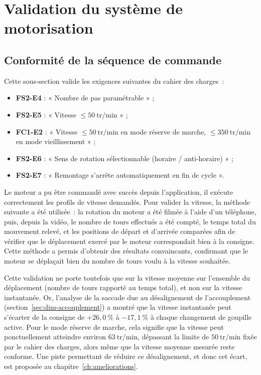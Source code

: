 
\section{Validation du système de motorisation}
\label{sec:valid-moteur}

\subsection{Conformité de la séquence de commande}

Cette sous-section valide les exigences suivantes du cahier des charges~:
\begin{itemize}
    \item \textbf{FS2-E4} : « Nombre de pas paramétrable » ;
    \item \textbf{FS2-E5} : « Vitesse $\leq 50\ \mathrm{tr/min}$ » ;
    \item \textbf{FC1-E2} : « Vitesse $\leq 50\ \mathrm{tr/min}$ en mode réserve
          de marche, $\leq 350\ \mathrm{tr/min}$ en mode vieillissement » ;
    \item \textbf{FS2-E6} : « Sens de rotation sélectionnable (horaire /
          anti-horaire) » ;
    \item \textbf{FS2-E7} : « Remontage s'arrête automatiquement en fin de
          cycle ».
\end{itemize}

Le moteur a pu être commandé avec succès depuis l'application, il exécute
correctement les profils de vitesse demandés. Pour valider la vitesse, la
méthode suivante a été utilisée~: la rotation du moteur a été filmée à l'aide
d'un téléphone, puis, depuis la vidéo, le nombre de tours effectués a été
compté, le temps total du mouvement relevé, et les positions de départ et
d'arrivée comparées afin de vérifier que le déplacement exercé par le moteur
correspondait bien à la consigne. Cette méthode a permis d'obtenir des
résultats convaincants, confirmant que le moteur se déplaçait bien du nombre de
tours voulu à la vitesse souhaitée.

Cette validation ne porte toutefois que sur la vitesse moyenne sur
l'ensemble du déplacement (nombre de tours rapporté au temps total), et non
sur la vitesse instantanée. Or, l'analyse de la saccade due au
désalignement de l'accouplement (section~\ref{sec:dim-accouplement}) a
montré que la vitesse instantanée peut s'écarter de la consigne de
$+26{,}0\ \%$ à $-17{,}1\ \%$ à chaque changement de goupille active. Pour
le mode réserve de marche, cela signifie que la vitesse peut ponctuellement
atteindre environ $63\ \mathrm{tr/min}$, dépassant la limite de
$50\ \mathrm{tr/min}$ fixée par le cahier des charges, alors même que la
vitesse moyenne mesurée reste conforme. Une piste permettant de réduire ce
désalignement, et donc cet écart, est proposée au
chapitre~\ref{ch:ameliorations}.

